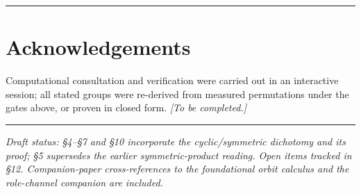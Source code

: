 \documentclass[11pt]{article}
\theoremstyle{plain}
\theoremstyle{definition}
\theoremstyle{remark}
\begin{document}
\begin{center}\rule{0.5\linewidth}{0.5pt}\end{center}

\hypertarget{acknowledgements}{%
\section*{Acknowledgements}\label{acknowledgements}}

Computational consultation and verification were carried out in an interactive session; all stated groups were re-derived from measured permutations under the gates above, or proven in closed form. \emph{{[}To be completed.{]}}

\begin{center}\rule{0.5\linewidth}{0.5pt}\end{center}

\emph{Draft status: §4--§7 and §10 incorporate the cyclic/symmetric dichotomy and its proof; §5 supersedes the earlier symmetric-product reading. Open items tracked in §12. Companion-paper cross-references to the foundational orbit calculus and the role-channel companion are included.}
\end{document}
